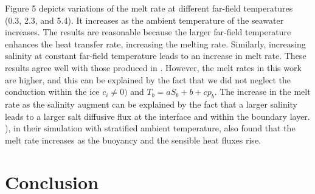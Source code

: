 \documentclass[11pt,a4paper]{article}
\begin{document}
	Figure 5 depicts variations of the melt rate at different far-field temperatures (0.3, 2.3, and 5.4). It increases as the ambient temperature of the seawater increases. The results are reasonable because the larger far-field temperature enhances the heat transfer rate, increasing the melting rate. Similarly, increasing salinity at constant far-field temperature leads to an increase in melt rate. These results agree well with those produced in \citep{gayen2016simulation}. However, the melt rates in this work are higher, and this can be explained by the fact that we did not neglect the conduction within the ice $c_i \neq 0)$ and $T_b = a S_b+b+c p_b$. The increase in the melt rate as the salinity augment can be explained by the fact that a larger salinity leads to a larger salt diffusive flux at the interface and within the boundary layer. \cite{jenkins2011convection}), in their simulation with stratified ambient temperature, also found that the melt rate increases as the buoyancy and the sensible heat fluxes rise.
	
	
	\section{Conclusion}
	
	
	
	
	
	
	\newpage
	
	
\end{document}
